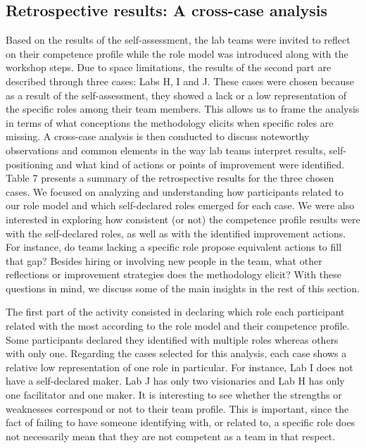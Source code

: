 \documentclass[AMA,STIX1COL,APA,STIX2COL]{WileyNJD-v2}
\begin{document}
\hypertarget{retrospective-results-a-cross-case-analysis}{%
\subsection{Retrospective results: A cross-case
analysis}\label{retrospective-results-a-cross-case-analysis}}

Based on the results of the self-assessment, the lab teams were invited
to reflect on their competence profile while the role model was
introduced along with the workshop steps. Due to space limitations, the
results of the second part are described through three cases: Labs H, I
and J. These cases were chosen because as a result of the
self-assessment, they showed a lack or a low representation of the
specific roles among their team members. This allows us to frame the
analysis in terms of what conceptions the methodology elicits when
specific roles are missing. A cross-case analysis is then conducted to
discuss noteworthy observations and common elements in the way lab teams
interpret results, self-positioning and what kind of actions or points
of improvement were identified. Table 7 presents a summary of the
retrospective results for the three chosen cases. We focused on
analyzing and understanding how participants related to our role model
and which self-declared roles emerged for each case. We were also
interested in exploring how consistent (or not) the competence profile
results were with the self-declared roles, as well as with the
identified improvement actions. For instance, do teams lacking a
specific role propose equivalent actions to fill that gap? Besides
hiring or involving new people in the team, what other reflections or
improvement strategies does the methodology elicit? With these questions
in mind, we discuss some of the main insights in the rest of this
section.

The first part of the activity consisted in declaring which role each
participant related with the most according to the role model and their
competence profile. Some participants declared they identified with
multiple roles whereas others with only one. Regarding the cases
selected for this analysis, each case shows a relative low
representation of one role in particular. For instance, Lab I does not
have a self-declared maker. Lab J has only two visionaries and Lab H has
only one facilitator and one maker. It is interesting to see whether the
strengths or weaknesses correspond or not to their team profile. This is
important, since the fact of failing to have someone identifying with,
or related to, a specific role does not necessarily mean that they are
not competent as a team in that respect.
\end{document}
